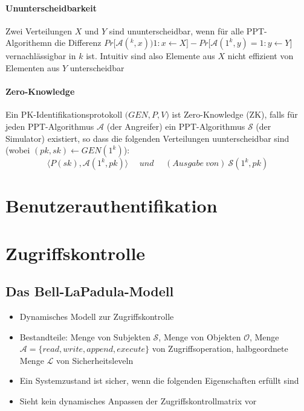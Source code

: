 \paragraph{Ununterscheidbarkeit} Zwei Verteilungen \(X\) und \(Y\) sind ununterscheidbar, wenn für alle PPT-Algorithemn die Differenz \(Pr\big\lbrack\mathcal{A}(^k,x) ) 1 : x\leftarrow X\big\rbrack - Pr\big\lbrack\mathcal{A}(1^k,y) = 1 : y\leftarrow Y\big\rbrack\) vernachlässigbar in \(k\) ist. Intuitiv sind also Elemente aus \(X\) nicht effizient von Elementen aus \(Y\) unterscheidbar

\paragraph{Zero-Knowledge} Ein PK-Identifikationsprotokoll \(\big(GEN,P,V\big)\) ist Zero-Knowledge (ZK), falls für jeden PPT-Algorithmus \(\mathcal{A}\) (der Angreifer) ein PPT-Algorithmus \(\mathcal{S}\) (der Simulator) existiert, so dass die folgenden Verteilungen uunterscheidbar sind (wobei \((pk,sk) \leftarrow GEN(1^k)\)):
\[\langle P(sk),\mathcal{A}(1^k,pk)\rangle~~~~~~und~~~~~~(Ausgabe~von)~\mathcal{S}(1^k,pk)\]



\section{Benutzerauthentifikation}



\section{Zugriffskontrolle}

\subsection{Das Bell-LaPadula-Modell}
\begin{itemize}
	\item Dynamisches Modell zur Zugriffskontrolle
	\item Bestandteile: Menge von Subjekten \(\mathcal{S}\), Menge von Objekten \(\mathcal{O}\), Menge \(\mathcal{A} = \{read,write,append,execute\}\) von Zugriffsoperation, halbgeordnete Menge \(\mathcal{L}\) von Sicherheitsleveln
	\item Ein Systemzustand ist sicher, wenn die folgenden Eigenschaften erfüllt sind
	\item Sieht kein dynamisches Anpassen der Zugriffskontrollmatrix vor
\end{itemize}

